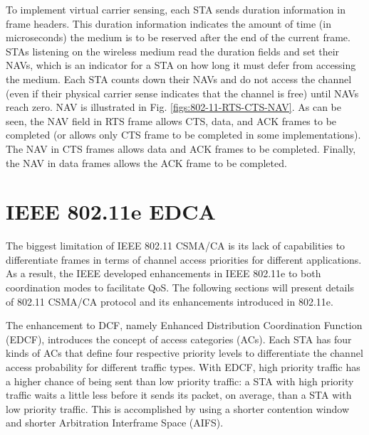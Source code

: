 To implement virtual carrier sensing, each STA sends duration information in frame headers. This duration information indicates the amount of time (in microseconds) the medium is to be reserved after the end of the current frame. STAs listening on the wireless medium read the duration fields and set their NAVs, which is an indicator for a STA on how long it must defer from accessing the medium. Each STA counts down their NAVs and do not access the channel (even if their physical carrier sense indicates that the channel is free) until NAVs reach zero. NAV is illustrated in Fig. \ref{figs:802-11-RTS-CTS-NAV}. As can be seen, the NAV field in RTS frame allows CTS, data, and ACK frames to be completed (or allows only CTS frame to be completed in some implementations). The NAV in CTS frames allows data and ACK frames to be completed. Finally, the NAV in data frames allows the ACK frame to be completed.


\section{IEEE 802.11e EDCA}
\label{80211e}

The biggest limitation of IEEE 802.11 CSMA/CA is its lack of capabilities to differentiate frames in terms of channel access priorities for different applications. As a result, the IEEE developed enhancements in IEEE 802.11e to both coordination modes to facilitate QoS. The following sections will present details of 802.11 CSMA/CA protocol and its enhancements introduced in 802.11e. 

The enhancement to DCF, namely Enhanced Distribution Coordination Function (EDCF), introduces the concept of access categories (ACs). Each STA has four kinds of ACs that define four respective priority levels to differentiate the channel access probability for different traffic types. With EDCF, high priority traffic has a higher chance of being sent than low priority traffic: a STA with high priority traffic waits a little less before it sends its packet, on average, than a STA with low priority traffic. This is accomplished by using a shorter contention window and shorter Arbitration Interframe Space (AIFS).

